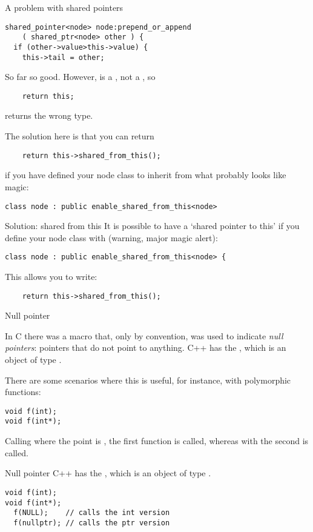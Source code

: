 \begin{slide}{A problem with shared pointers}
  \label{sl:share-ptr-node-sh}
\begin{verbatim}
shared_pointer<node> node:prepend_or_append
    ( shared_ptr<node> other ) {
  if (other->value>this->value) {
    this->tail = other;
\end{verbatim}
So far so good. However,  is a , not a
, so
\begin{verbatim}
    return this;
\end{verbatim}
returns the wrong type.
\end{slide}

The solution here is that you can return
\begin{verbatim}
    return this->shared_from_this();
\end{verbatim}
if you have defined your node class to inherit from what probably
looks like magic:
\begin{verbatim}
class node : public enable_shared_from_this<node>
\end{verbatim}

\begin{slide}{Solution: shared from this}
  \label{sl:share-ptr-node-from}
  It is possible to have a `shared pointer to this' if you
  define your node class with (warning, major magic alert):
\begin{verbatim}
class node : public enable_shared_from_this<node> {
\end{verbatim}
This allows you to write:
\begin{verbatim}
    return this->shared_from_this();
\end{verbatim}
\end{slide}

 {Null pointer}

In C there was a macro  that, only by convention, was
used to indicate
\emph{null pointers}:
pointers that do not point to anything.
C++ has the , which is an object of type
.

There are some scenarios where this is useful, for instance, with
polymorphic functions:
\begin{verbatim}
void f(int);
void f(int*);
\end{verbatim}
Calling  where the point is , the first function is
called, whereas with  the second is called.

\begin{slide}{Null pointer}
  \label{sl:cpp-nullptr}
  C++ has the , which is an object of type
  .

\begin{verbatim}
void f(int);
void f(int*);
  f(NULL);    // calls the int version
  f(nullptr); // calls the ptr version
\end{verbatim}
\end{slide}

